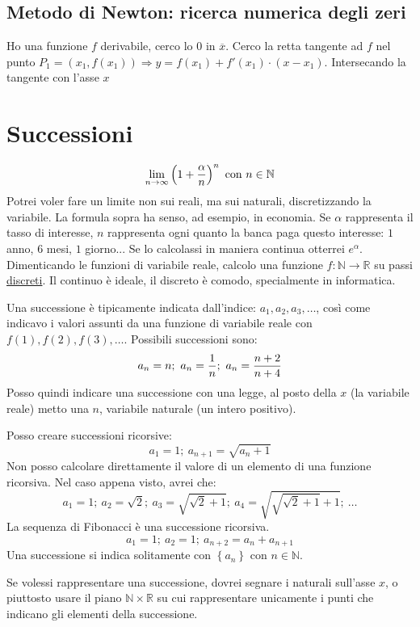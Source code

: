 \documentclass[12pt,a4paper]{article}
\begin{document}
\subsection{Metodo di Newton: ricerca numerica degli zeri}
Ho una funzione $f$ derivabile, cerco lo $0$ in $\overline{x}$. Cerco la retta
tangente ad $f$ nel punto $P_1 = \left(x_1, f(x_1) \right) \Rightarrow
y = f(x_1) + f'(x_1) \cdot (x - x_1)$. Intersecando la tangente con l'asse $x$


\newpage
\section{Successioni}
$$
\lim_{n \to \infty} \left( 1 + {\alpha \over n} \right)^n 
\text{ con } n \in \mathbb{N}
$$
Potrei voler fare un limite non sui reali, ma sui naturali, discretizzando
la variabile. La formula sopra ha senso, ad esempio, in economia. Se $\alpha$
rappresenta il tasso di interesse, $n$ rappresenta ogni quanto la banca
paga questo interesse: $1$ anno, $6$ mesi, $1$ giorno... Se lo calcolassi
in maniera continua otterrei $e^{\alpha}$. Dimenticando le funzioni 
di variabile reale, calcolo una funzione $f: \mathbb{N} \to \mathbb{R}$ su 
passi \underline{discreti}. Il continuo \`e ideale, il discreto \`e comodo,
specialmente in informatica.

Una successione \`e tipicamente indicata dall'indice: $a_1, a_2, a_3, \dots$,
cos\`i come indicavo i valori assunti da una funzione di variabile reale
con $f(1), f(2), f(3), \dots$. Possibili successioni sono:
$$
a_n = n ; \ a_n = {1 \over n} ; \ a_n = {n+2 \over n+4}
$$
Posso quindi indicare una successione con una legge, al posto della $x$ (la
variabile reale) metto una $n$, variabile naturale (un intero positivo).

Posso creare successioni ricorsive:
$$
a_1 = 1 ; \ a_{n+1} = \sqrt{a_n + 1}
$$
Non posso calcolare direttamente il valore di un elemento di una funzione
ricorsiva. Nel caso appena visto, avrei che:
$$
a_1 = 1; \ a_2 = \sqrt{2} ; \ a_3 = \sqrt{ \sqrt{2} + 1}; \
a_4 = \sqrt{\sqrt{ \sqrt{2} + 1} + 1} ; \ \dots
$$
La sequenza di Fibonacci \`e una successione ricorsiva.
$$
a_1 = 1; \ a_2 = 1; \ a_{n+2} = a_n + a_{n+1}
$$
Una successione si indica solitamente con $ {\left\{ a_n \right\}} $ con
$ {n \in \mathbb{N}} $.

Se volessi rappresentare una successione, dovrei segnare i naturali 
sull'asse $x$, o piuttosto usare il piano $\mathbb{N} \times \mathbb{R}$
su cui rappresentare unicamente i punti che indicano gli elementi 
della successione.
\end{document}
